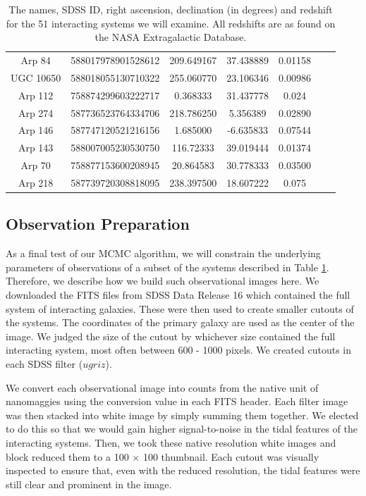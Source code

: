 \begin{table}
\begin{tabular}{|c|c|c|c|c|c|c|}
         Arp 84 & 588017978901528612 & 209.649167 & 37.438889 & 0.01158 \\
         UGC 10650 & 588018055130710322 & 255.060770 & 23.106346 & 0.00986 \\
         Arp 112 & 758874299603222717 & 0.368333 & 31.437778 & 0.024 \\
         Arp 274 & 587736523764334706 & 218.786250 & 5.356389 & 0.02890 \\
         Arp 146 & 587747120521216156 & 1.685000 & -6.635833 & 0.07544 \\
         Arp 143 & 588007005230530750 & 116.72333 & 39.019444 & 0.01374 \\
         Arp 70 & 758877153600208945 & 20.864583 & 30.778333 & 0.03500 \\
         Arp 218 & 587739720308818095 & 238.397500 & 18.607222 & 0.075 \\
         \hline
    \end{tabular}
    \caption[The names, SDSS ID, right ascension, declination (in degrees) and redshift for the 51 interacting systems we will examine.]{The names, SDSS ID, right ascension, declination (in degrees) and redshift for the 51 interacting systems we will examine. All redshifts are as found on the NASA Extragalactic Database.}
    \label{tab:Objects}
\end{table}

\subsection{Observation Preparation}\label{data:obs-prep}
\noindent As a final test of our MCMC algorithm, we will constrain the underlying parameters of observations of a subset of the systems described in Table \ref{tab:Objects}. Therefore, we describe how we build such observational images here. We downloaded the FITS files from SDSS Data Release 16 which contained the full system of interacting galaxies. These were then used to create smaller cutouts of the systems. The coordinates of the primary galaxy are used as the center of the image. We judged the size of the cutout by whichever size contained the full interacting system, most often between 600 - 1000 pixels. We created cutouts in each SDSS filter ($ugriz$).

We convert each observational image into counts from the native unit of nanomaggies using the conversion value in each FITS header. Each filter image was then stacked into white image by simply summing them together. We elected to do this so that we would gain higher signal-to-noise in the tidal features of the interacting systems. Then, we took these native resolution white images and block reduced them to a 100 $\times$ 100 thumbnail. Each cutout was visually inspected to ensure that, even with the reduced resolution, the tidal features were still clear and prominent in the image.

